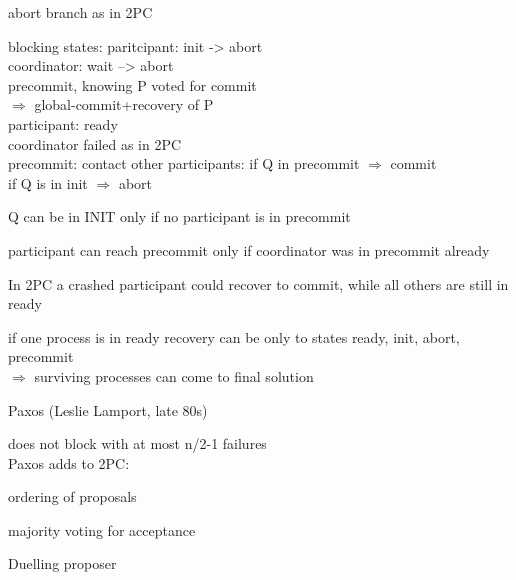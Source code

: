 \begin{compactitem}
\begin{compactitem}
\begin{minipage}{\linewidth}
			\label{img:3pc}
			\end{minipage}
		\item abort branch as in 2PC
		\item blocking states: paritcipant: init -> abort\\
		coordinator: wait --> abort\\
		precommit, knowing P voted for commit\\
		$\Rightarrow$ global-commit+recovery of P\\
		participant: ready\\
			coordinator failed as in 2PC\\
			precommit: contact other participants: if Q in precommit $\Rightarrow$ commit\\
			if Q is in init $\Rightarrow$ abort
		\item Q can be in INIT only if no participant is in precommit
		\item participant can reach precommit only if coordinator was in precommit already
		\item In 2PC a crashed participant could recover to commit, while all others are still in ready
		\item if one process is in ready recovery can be only to states ready, init, abort, precommit\\
		$\Rightarrow$ surviving processes can come to final solution
	\end{compactitem}
	\item Paxos (Leslie Lamport, late 80s)
	\begin{compactitem}
		\item does not block with at most n/2-1 failures\\
		Paxos adds to 2PC:
		\begin{compactitem}
			\item ordering of proposals
			\item majority voting for acceptance
		\end{compactitem}
		Duelling proposer
	\end{compactitem}
\end{compactitem}


